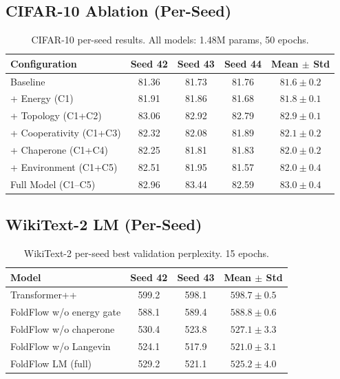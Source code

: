 \documentclass[10pt]{article}
\begin{document}
\subsection{CIFAR-10 Ablation (Per-Seed)}

\begin{table}[h]
\centering
\caption{CIFAR-10 per-seed results.  All models: 1.48M params, 50 epochs.}
\label{tab:cifar_per_seed}
\small
\begin{tabular}{@{}lccc|c@{}}
\toprule
Configuration & Seed 42 & Seed 43 & Seed 44 & Mean $\pm$ Std \\
\midrule
Baseline           & 81.36 & 81.73 & 81.76 & $81.6 \pm 0.2$ \\
+ Energy (C1)      & 81.91 & 81.86 & 81.68 & $81.8 \pm 0.1$ \\
+ Topology (C1+C2) & 83.06 & 82.92 & 82.79 & $82.9 \pm 0.1$ \\
+ Cooperativity (C1+C3) & 82.32 & 82.08 & 81.89 & $82.1 \pm 0.2$ \\
+ Chaperone (C1+C4) & 82.25 & 81.81 & 81.83 & $82.0 \pm 0.2$ \\
+ Environment (C1+C5) & 82.51 & 81.95 & 81.57 & $82.0 \pm 0.4$ \\
\midrule
Full Model (C1--C5) & 82.96 & 83.44 & 82.59 & $83.0 \pm 0.4$ \\
\bottomrule
\end{tabular}
\end{table}

\subsection{WikiText-2 LM (Per-Seed)}

\begin{table}[h]
\centering
\caption{WikiText-2 per-seed best validation perplexity.  15 epochs.}
\label{tab:wt2_per_seed}
\small
\begin{tabular}{@{}lcc|c@{}}
\toprule
Model & Seed 42 & Seed 43 & Mean $\pm$ Std \\
\midrule
Transformer++          & 599.2 & 598.1 & $598.7 \pm 0.5$ \\
FoldFlow w/o energy gate & 588.1 & 589.4 & $588.8 \pm 0.6$ \\
FoldFlow w/o chaperone   & 530.4 & 523.8 & $527.1 \pm 3.3$ \\
FoldFlow w/o Langevin    & 524.1 & 517.9 & $521.0 \pm 3.1$ \\
FoldFlow LM (full)       & 529.2 & 521.1 & $525.2 \pm 4.0$ \\
\bottomrule
\end{tabular}
\end{table}
\end{document}
